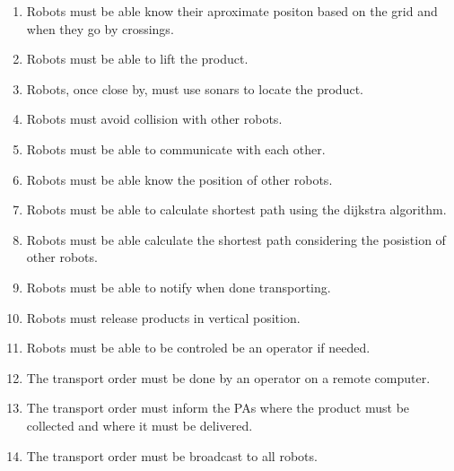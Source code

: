 \begin{enumerate}
	\item Robots must be able know their aproximate positon based on the grid and when they go by crossings. %
	\item Robots must be able to lift the product. %
	\item Robots, once close by, must use sonars to locate the product. %
	\item Robots must avoid collision with other robots. %
	\item Robots must be able to communicate with each other. %
	\item Robots must be able know the position of other robots. %
	\item Robots must be able to calculate shortest path using the dijkstra algorithm. %
	\item Robots must be able calculate the shortest path considering the posistion of other robots. %
	\item Robots must be able to notify when done transporting. %
	\item Robots must release products in vertical position. %
	\item Robots must be able to be controled be an operator if needed. %
	\item The transport order must be done by an operator on a remote computer. %
	\item The transport order must inform the PAs where the product must be collected and where it must be delivered. %
	\item The transport order must be broadcast to all robots. %
\end{enumerate}